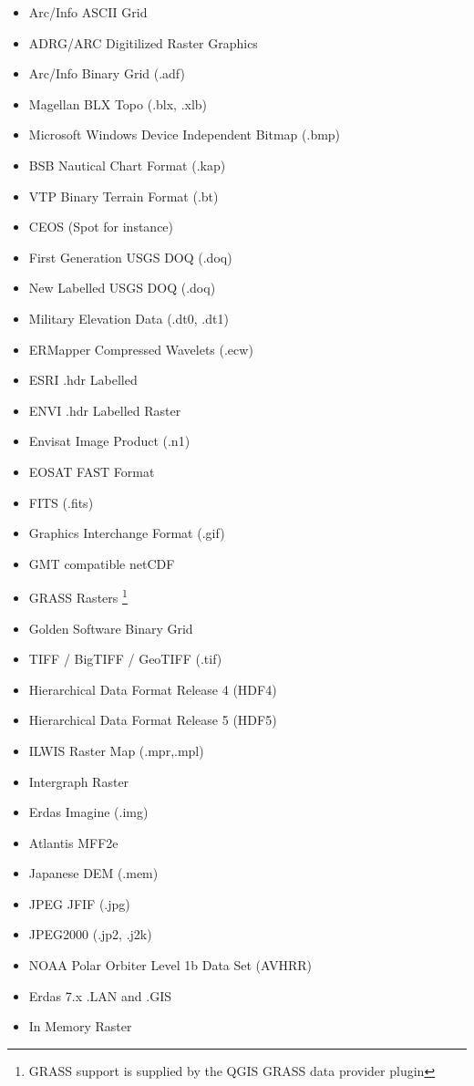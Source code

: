 \begin{itemize}
\item Arc/Info ASCII Grid
\item ADRG/ARC Digitilized Raster Graphics 
\item Arc/Info Binary Grid (.adf)
\item Magellan BLX Topo (.blx, .xlb)
\item Microsoft Windows Device Independent Bitmap (.bmp)
\item BSB Nautical Chart Format (.kap)
\item VTP Binary Terrain Format (.bt)
\item CEOS (Spot for instance)
\item First Generation USGS DOQ (.doq)
\item New Labelled USGS DOQ (.doq)
\item Military Elevation Data (.dt0, .dt1)
\item ERMapper Compressed Wavelets (.ecw)
\item ESRI .hdr Labelled
\item ENVI .hdr Labelled Raster
\item Envisat Image Product (.n1)
\item EOSAT FAST Format
\item FITS (.fits)
\item Graphics Interchange Format (.gif)
\item GMT compatible netCDF
\item GRASS Rasters \footnote{GRASS support is supplied by the QGIS GRASS data provider plugin} 
\item Golden Software Binary Grid
\item TIFF / BigTIFF / GeoTIFF (.tif)
\item Hierarchical Data Format Release 4 (HDF4)
\item Hierarchical Data Format Release 5 (HDF5)
\item ILWIS Raster Map (.mpr,.mpl)
\item Intergraph Raster
\item Erdas Imagine (.img)
\item Atlantis MFF2e
\item Japanese DEM (.mem)
\item JPEG JFIF (.jpg)
\item JPEG2000 (.jp2, .j2k)
\item NOAA Polar Orbiter Level 1b Data Set (AVHRR)
\item Erdas 7.x .LAN and .GIS
\item In Memory Raster

\end{itemize}

